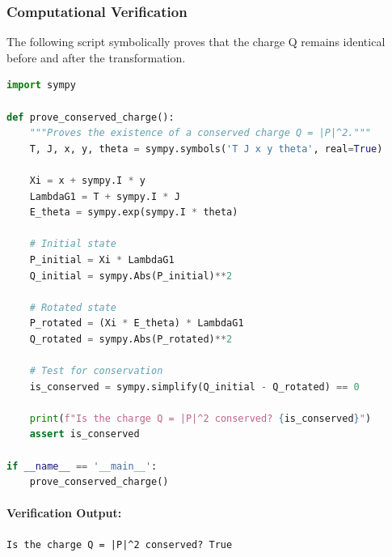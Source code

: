 \subsubsection*{Computational Verification}
The following script symbolically proves that the charge Q remains identical before and after the transformation.
\begin{lstlisting}[language=Python, caption={Symbolic proof of a conserved Noether charge.}]
import sympy

def prove_conserved_charge():
    """Proves the existence of a conserved charge Q = |P|^2."""
    T, J, x, y, theta = sympy.symbols('T J x y theta', real=True)
    
    Xi = x + sympy.I * y
    LambdaG1 = T + sympy.I * J
    E_theta = sympy.exp(sympy.I * theta)
    
    # Initial state
    P_initial = Xi * LambdaG1
    Q_initial = sympy.Abs(P_initial)**2
    
    # Rotated state
    P_rotated = (Xi * E_theta) * LambdaG1
    Q_rotated = sympy.Abs(P_rotated)**2
    
    # Test for conservation
    is_conserved = sympy.simplify(Q_initial - Q_rotated) == 0
    
    print(f"Is the charge Q = |P|^2 conserved? {is_conserved}")
    assert is_conserved

if __name__ == '__main__':
    prove_conserved_charge()
\end{lstlisting}
\paragraph{Verification Output:}
\begin{verbatim}
Is the charge Q = |P|^2 conserved? True
\end{verbatim}